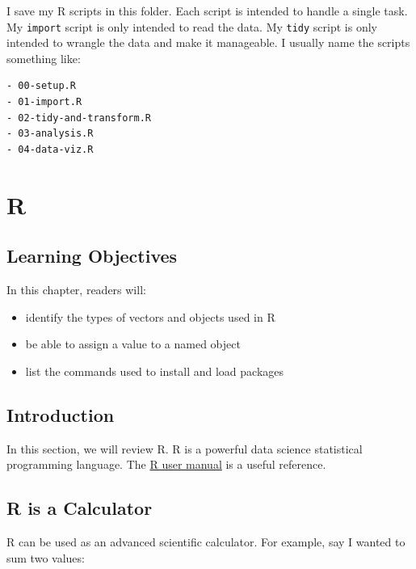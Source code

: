 \documentclass[
  letterpaper,
  DIV=11,
  numbers=noendperiod]{scrreprt}
\providecommand{\tightlist}{%
  \setlength{\itemsep}{0pt}\setlength{\parskip}{0pt}}\usepackage{longtable,booktabs,array}
\begin{document}
I save my R scripts in this folder. Each script is intended to handle a
single task. My \texttt{import} script is only intended to read the
data. My \texttt{tidy} script is only intended to wrangle the data and
make it manageable. I usually name the scripts something like:

\begin{verbatim}
- 00-setup.R
- 01-import.R
- 02-tidy-and-transform.R
- 03-analysis.R
- 04-data-viz.R
\end{verbatim}


\hypertarget{r-1}{%
\chapter{R}\label{r-1}}

\hypertarget{learning-objectives-3}{%
\section{Learning Objectives}\label{learning-objectives-3}}

In this chapter, readers will:

\begin{itemize}
\tightlist
\item
  identify the types of vectors and objects used in R
\item
  be able to assign a value to a named object
\item
  list the commands used to install and load packages
\end{itemize}

\hypertarget{introduction-3}{%
\section{Introduction}\label{introduction-3}}

In this section, we will review R. R is a powerful data science
statistical programming language. The
\href{https://cloud.r-project.org/doc/manuals/r-release/R-intro.html}{R
user manual} is a useful reference.

\hypertarget{r-is-a-calculator}{%
\section{R is a Calculator}\label{r-is-a-calculator}}

R can be used as an advanced scientific calculator. For example, say I
wanted to sum two values:
\end{document}
